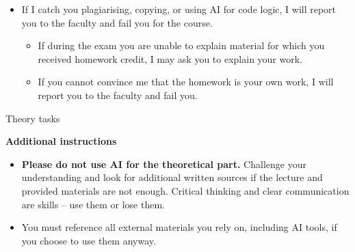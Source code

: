 \documentclass{homework}
\begin{document}
\begin{itemize}
\begin{itemize}
    \item Not acceptable: e.g. generating code logic, library use, or crypto operations.
    \item If you use AI in any form, including for rewording, state in your report where and what you used it for.
    \item I recommend asking in the server or contacting me instead of using AI.
  \end{itemize}
  \item If I catch you plagiarising, copying, or using AI for code logic, I will report you to the faculty and fail you for the course.
  \begin{itemize}
    \item If during the exam you are unable to explain material for which you received homework credit, I may ask you to explain your work.
    \item If you cannot convince me that the homework is your own work, I will report you to the faculty and fail you.
  \end{itemize}
\end{itemize}

\newpage

\begin{center}
  Theory tasks
\end{center}

\textbf{Additional instructions}

\begin{itemize}
  \item \textbf{Please do not use AI for the theoretical part.}
  Challenge your understanding and look for additional written sources if the lecture and provided materials are not enough.
  Critical thinking and clear communication are skills -- use them or lose them.
  \item You must reference all external materials you rely on, including AI tools, if you choose to use them anyway.
\end{itemize}
\end{document}
